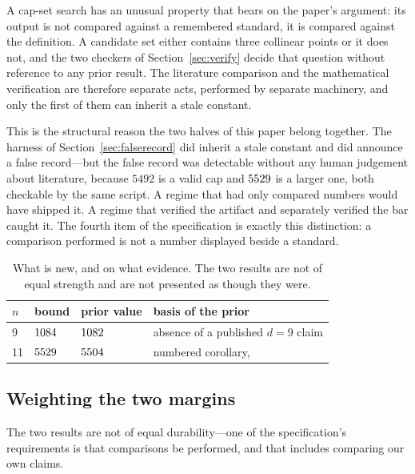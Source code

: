 \documentclass[journal]{IEEEtran}
\begin{document}
A cap-set search has an unusual property that bears on the paper's argument:
its output is not compared against a remembered standard, it is compared
against the definition. A candidate set either contains three collinear
points or it does not, and the two checkers of Section~\ref{sec:verify} decide
that question without reference to any prior result. The literature
comparison and the mathematical verification are therefore separate acts,
performed by separate machinery, and only the first of them can inherit a
stale constant.

This is the structural reason the two halves of this paper belong together.
The harness of Section~\ref{sec:falserecord} did inherit a stale constant and
did announce a false record---but the false record was detectable without any
human judgement about literature, because $5492$ is a valid cap and
$5529$ is a larger one, both checkable by the same script. A regime
that had only compared numbers would have shipped it. A regime that verified
the artifact and separately verified the bar caught it. The fourth item of the
specification is exactly this distinction: a comparison performed is not a
number displayed beside a standard.

\begin{table}[!t]
\caption{What is new, and on what evidence. The two results are not of equal
strength and are not presented as though they were.}
\label{tab:claims}
\centering
\small
\begin{tabular}{@{}p{0.9cm}p{1.6cm}p{1.9cm}p{2.6cm}@{}}
\toprule
$n$ & bound & prior value & basis of the prior \\
\midrule
9  & $1084$   & $1082$   & absence of a published $d=9$ claim \\
11 & $5529$ & $5504$ & numbered corollary, \cite{karapetyan2023} \\
\bottomrule
\end{tabular}
\end{table}

\subsection{Weighting the two margins}

The two results are not of equal durability---one of the specification's
requirements is that comparisons be performed, and that includes
comparing our own claims.
\end{document}

